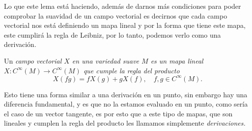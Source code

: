 Lo que este lema está haciendo, además de darnos más condiciones para poder comprobar la suavidad de un campo vectorial es decirnos que cada campo vectorial nos está definiendo un mapa lineal y por la forma que tiene este mapa, este cumplirá la regla de Leibniz, por lo tanto, podemos verlo como una derivación.

\begin{definition}
	Un \it{campo vectorial} $X$ en una variedad suave $M$ es un mapa lineal $X: C^{\infty}(M) \to C^{\infty}(M)$ que cumple la regla del producto
	\[
		X(fg) = fX(g) + gX(f), \quad f,g \in C^{\infty}(M).
	\]
\end{definition}

Esto tiene una forma similar a una derivación en un punto, sin embargo hay una diferencia fundamental, y es que no la estamos evaluado en un punto, como sería el caso de un vector tangente, es por esto que a este tipo de mapas, que son lineales y cumplen la regla del producto les llamamos simplemente \it{derivaciones}.

